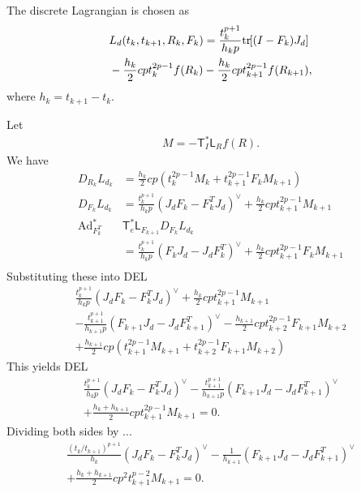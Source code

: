 \documentclass[letterpaper, 10pt, conference]{ieeeconf}
\newcommand{\bracket}[1]{\ensuremath{\left[ #1 \right]}}
\newcommand{\tr}[1]{\mbox{tr}\ensuremath{\negthickspace\bracket{#1}}}
\newcommand{\T}{\ensuremath{\mathsf{T}}}
\renewcommand{\L}{\ensuremath{\mathsf{L}}}
\newcommand{\Ad}{\ensuremath{\mathrm{Ad}}}
\begin{document}
The discrete Lagrangian is chosen as
\begin{align*}
    & L_d(t_k, t_{k+1}, R_k, F_k) = \frac{t_{k}^{p+1}}{h_k p} \tr{(I-F_k)J_d}\\
    &- \frac{h_k}{2}c p t_k^{2p-1} f(R_k) - \frac{h_k}{2}c p t_{k+1}^{2p-1} f(R_{k+1}),
\end{align*}
where $h_k = t_{k+1}-t_k$.

Let 
\begin{align*}
    M = -\T^*_I \L_R f(R).
\end{align*}
We have
\begin{align*}
    D_{R_k} L_{d_k} &= \frac{h_k}{2} cp (t_k^{2p-1} M_k + t_{k+1}^{2p-1} F_k M_{k+1})\\
    D_{F_k} L_{d_k} &= \frac{t^{p+1}_{k}}{h_k p} (J_dF_k -F_k^T J_d)^\vee + \frac{h_k}{2} cpt^{2p-1}_{k+1} M_{k+1} \\
    \Ad^*_{F_k^T} & \T^*_e \L_{F_{k+1}} D_{F_k} L_{d_k}\\
                    & = \frac{t^{p+1}_{k}}{h_k p} (F_k J_d - J_dF_k^T)^\vee + \frac{h_k}{2} cpt^{2p-1}_{k+1} F_k M_{k+1} \\
\end{align*}
Substituting these into DEL
\begin{align*}
\frac{t^{p+1}_{k}}{h_k p} (J_dF_k -F_k^T J_d)^\vee + \frac{h_k}{2} cpt^{2p-1}_{k+1} M_{k+1}\\
- \frac{t^{p+1}_{k+1}}{h_{k+1} p} (F_{k+1} J_d - J_dF_{k+1}^T)^\vee - \frac{h_{k+1}}{2} cpt^{2p-1}_{k+2} F_{k+1} M_{k+2}\\
+ \frac{h_{k+1}}{2} cp (t_{k+1}^{2p-1} M_{k+1} + t_{k+2}^{2p-1} F_{k+1} M_{k+2})
\end{align*}
This yields DEL
\begin{gather}
\frac{t^{p+1}_{k}}{h_k p} (J_dF_k -F_k^T J_d)^\vee 
-\frac{t^{p+1}_{k+1}}{h_{k+1} p} (F_{k+1} J_d - J_dF_{k+1}^T)^\vee\nonumber \\
+ \frac{h_k+h_{k+1}}{2} cp t_{k+1}^{2p-1} M_{k+1}  =0.
\end{gather}
Dividing both sides by ...
\begin{gather}
    \frac{(t_k/t_{k+1})^{p+1}}{h_k } (J_dF_k -F_k^T J_d)^\vee 
-\frac{1}{h_{k+1} } (F_{k+1} J_d - J_dF_{k+1}^T)^\vee\nonumber \\
+ \frac{h_k+h_{k+1}}{2} cp^2 t_{k+1}^{p-2} M_{k+1}  =0.
\end{gather}
\end{document}
